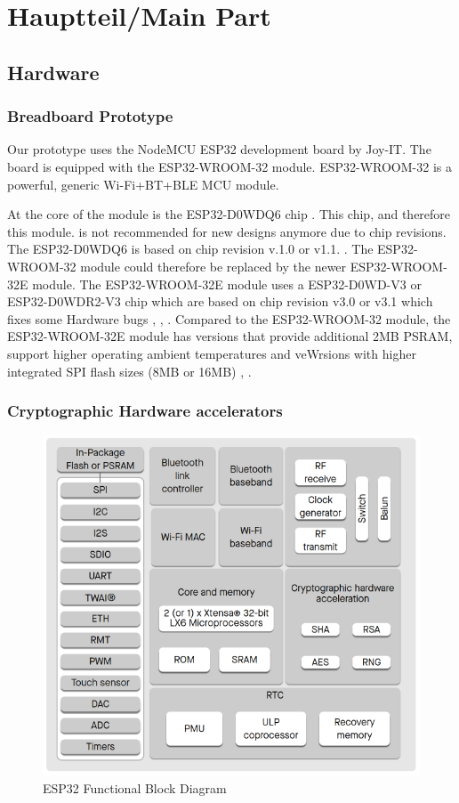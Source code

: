 \chapter{Hauptteil/Main Part}

\section{Hardware}
\subsection{Breadboard Prototype}
Our prototype uses the NodeMCU ESP32 development board by Joy-IT. The board is equipped with the ESP32-WROOM-32 module. ESP32-WROOM-32 is a powerful, generic Wi-Fi+BT+BLE MCU module. 

At the core of the module is the ESP32-D0WDQ6 chip \cite[6]{esp32-module}. This chip, and therefore this module. is not recommended for new designs anymore due to chip revisions. The ESP32-D0WDQ6 is based on chip revision v.1.0 or v1.1. \cite[11]{esp32-datasheet}. The ESP32-WROOM-32 module could therefore be replaced by the newer ESP32-WROOM-32E module. The ESP32-WROOM-32E module uses a ESP32-D0WD-V3 or ESP32-D0WDR2-V3 chip which are based on chip revision v3.0 or v3.1 which fixes some Hardware bugs \cite[1]{esp32-module-new}, \cite[11]{esp32-datasheet}, \cite[3-4]{esp32-errata}. Compared to the ESP32-WROOM-32 module, the ESP32-WROOM-32E module has versions that provide additional 2MB PSRAM, support higher operating ambient temperatures and veWrsions with higher integrated SPI flash sizes (8MB or 16MB) \cite[2]{esp32-module-new}, \cite[6-7]{esp32-module}.

\subsection{Cryptographic Hardware accelerators}
\begin{figure}
	\centering
	\includegraphics[scale=.5]{abbildungen/functional-block-diagram}
	\caption{ESP32 Functional Block Diagram}
	\label{Fig:esp32-crypto}
\end{figure}

